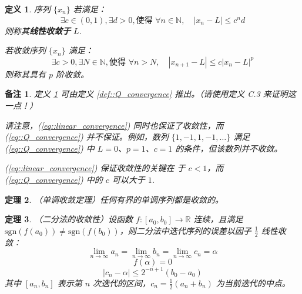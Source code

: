 \documentclass[a4paper]{ctexart}
\newtheorem{theorem}{定理}
\newtheorem{remark}{备注}
\newtheorem{definition}[theorem]{定义} %
\numberwithin{theorem}{section}
\numberwithin{equation}{section}
\numberwithin{figure}{section}
\numberwithin{remark}{section}
\begin{document}
\begin{definition}
    \label{def::linear_convergence}
序列 \(\{x_n\}\) 若满足：
\begin{equation}
    \label{eq::linear_convergence}
\exists c \in (0, 1), \exists d > 0, \text{使得 } \forall n \in \mathbb{N}, \quad |x_n - L| \le c^n d
\end{equation}
则称其\textbf{线性收敛于} \(L\).

若收敛序列 \(\{x_n\}\) 满足：
\begin{equation}
    \label{eq::Q_convergence}
\exists c > 0, \exists N \in \mathbb{N}, \text{使得 } \forall n > N, \quad |x_{n+1} - L| \le c|x_n - L|^p
\end{equation}
则称其具有 \(p\) 阶收敛。  
\end{definition}

\begin{remark}
定义 \ref{def::linear_convergence} 可由定义 \ref{def::Q_convergence} 推出。（请使用定义 C.3 来证明这一点！）

请注意，(\ref{eq::linear_convergence}) 同时也保证了收敛性，而 (\ref{eq::Q_convergence}) 并不保证。例如，数列 \(\{1, -1, 1, -1, \dots\}\) 
满足 (\ref{eq::Q_convergence}) 中 \(L = 0\)、\(p = 1\)、\(c = 1\) 的条件，但该数列并不收敛。

(\ref{eq::linear_convergence}) 保证收敛性的关键在 于 \(c < 1\)，而 (\ref{eq::Q_convergence}) 中的 \(c\) 可以大于 $1$.
\end{remark}

\begin{theorem}
（单调收敛定理）任何有界的单调序列都是收敛的。
\end{theorem}

\begin{theorem}
    \label{thm::bisection}
（二分法的收敛性）设函数 \(f : [a_0, b_0] \to \mathbb{R}\) 连续，且满足 \(\text{sgn}(f(a_0)) \neq \text{sgn}(f(b_0))\)，则二分法中迭代序列的误差以因子 \(\frac{1}{2}\) 线性收敛：
\begin{equation}
\lim_{n \to \infty} a_n = \lim_{n \to \infty} b_n = \lim_{n \to \infty} c_n = \alpha
\end{equation}
\begin{equation}
f(\alpha) = 0
\end{equation}
\begin{equation}
|c_n - \alpha| \le 2^{-n+1}(b_0 - a_0)
\end{equation}
其中 \([a_n, b_n]\) 表示第 \(n\) 次迭代的区间，\(c_n = \frac{1}{2}(a_n + b_n)\) 为当前迭代的中点。    
\end{theorem}
\end{document}
